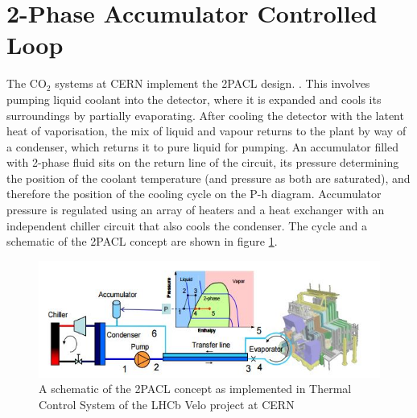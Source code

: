 \documentclass{report}
\begin{document}
\section{2-Phase Accumulator Controlled Loop}
\FloatBarrier
The CO$_2$ systems at CERN implement the 2PACL design. \cite{TIF PoS} \cite{bart}. This involves pumping liquid coolant into the detector, where it is expanded and cools its surroundings by partially evaporating. After cooling the detector with the latent heat of vaporisation, the mix of liquid and vapour returns to the plant by way of a condenser, which returns it to pure liquid for pumping. An accumulator filled with 2-phase fluid sits on the return line of the circuit, its pressure determining the position of the coolant temperature (and pressure as both are saturated), and therefore the position of the cooling cycle on the P-h diagram. Accumulator pressure is regulated using an array of heaters and a heat exchanger with an independent chiller circuit that also cools the condenser. The cycle and a schematic of the 2PACL concept are shown in figure \ref{fig:2PACL}.
\begin{figure}[h!]
\includegraphics{2PACLschem}
\caption{A schematic of the 2PACL concept as implemented in Thermal Control System of the LHCb Velo project at CERN \cite{CO2 PoS}}
\label{fig:2PACL}
\end{figure}
\end{document}
